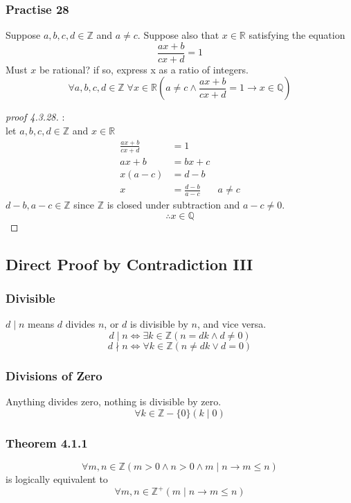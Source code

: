 \documentclass[12pt]{book}
\newcommand{\Z}{\mathbb{Z}}
\newcommand{\R}{\mathbb{R}}
\newcommand{\Q}{\mathbb{Q}}
\newcommand{\paren}[1]{\left( #1 \right)}
\begin{document}
\subsubsection{Practise 28}
    Suppose $a,b,c,d \in \Z$ and $a \neq c$. Suppose also that $x \in \R$ satisfying the equation
    \[
    \frac{ax+b}{cx+d}=1
    \]
    Must $x$ be rational? if so, express x as a ratio of integers. 
    \[
    \forall a,b,c,d  \in \Z \; \forall x \in \R 
    \paren{a\neq c \wedge \frac{ax+b}{cx+d}=1 \rightarrow x \in \Q}
    \]
    \begin{proof}[proof 4.3.28]:\\
    
    let $a,b,c,d \in \Z$ and $x \in \R$
    \begin{align*}
        \frac{ax+b}{cx+d}&=1\\
        ax+b &= bx+c\\
        x(a-c)&= d-b\\
        x &= \frac{d-b}{a-c} & a\neq c 
    \end{align*}
        $d-b, a-c \in \Z$ since $\Z$ is closed under subtraction and $a-c \neq 0$.
        \[
        \therefore x \in \Q
        \]
    \end{proof}

\subsection{Direct Proof by Contradiction III}
\subsubsection{Divisible}
$d\mid n$ means $d$ divides $n$, or $d$ is divisible by $n$, and vice versa.
\[
d \mid n \iff \exists k \in \Z \paren{n=dk \wedge d\neq 0}
\]
\[
d \nmid n \iff \forall k \in \Z \paren{ n\neq dk \vee d = 0}
\]
\subsubsection{Divisions of Zero}
Anything divides zero, nothing is divisible by zero. 
\[
\forall k \in \Z - \{0\} \paren{k \mid 0}
\]

\subsubsection{Theorem 4.1.1}
\[
\forall m,n\in \Z 
\paren{m>0 \wedge n>0 \wedge m \mid n \rightarrow m \leq n}
\]
is logically equivalent to
\[
\forall m,n \in \Z^+ \paren{
m \mid n \rightarrow m \leq n}
\]
\end{document}
